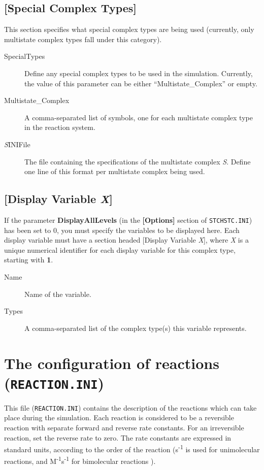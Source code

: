 \subsection{[Special Complex Types]}
This section specifies what special complex types are being used
(currently, only multistate complex types fall under this category).

\begin{description}
\item[SpecialTypes] Define any special complex types to be used in the
  simulation. Currently, the value of this parameter can be either
  ``Multistate\_Complex'' or empty.
  
\item[Multistate\_Complex] A comma-separated list of symbols, one for
  each multistate complex type in the reaction system.

\item[\emph{S}INIFile] The file containing the specifications of the multistate
       complex \emph{S}. Define one line of this format per multistate
       complex being used.
\end{description}

\subsection{[Display Variable \emph{X}]}
If the parameter \textbf{DisplayAllLevels} (in the \textbf{[Options]}
section of \texttt{STCHSTC.INI}) has been set to 0, you must specify the
variables to be displayed here. Each display variable must have a
section headed [Display Variable \emph{X}], where \emph{X} is a unique
numerical identifier for each display variable for this complex type,
starting with \textbf{1}.

\begin{description}
\item[Name] Name of the variable.
\item[Types] A comma-separated list of the complex type(s) this
  variable represents.
\end{description}


\section{The configuration of reactions (\texttt{REACTION.INI})}
\label{reaction_ini}
This file (\texttt{REACTION.INI}) contains the description of the reactions
which can take place during the simulation. Each reaction is
considered to be a reversible reaction with separate forward and
reverse rate constants. For an irreversible reaction, set the reverse
rate to zero. The rate constants are expressed in standard units,
according to the order of the reaction (s\textsuperscript{-1} is used
for unimolecular reactions, and
M\textsuperscript{-1}s\textsuperscript{-1} for bimolecular reactions
).

